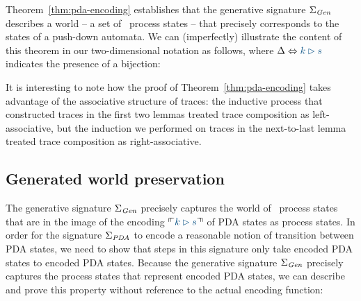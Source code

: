 Theorem~\ref{thm:pda-encoding} establishes that the generative
signature $\Sigma_{\it Gen}$ describes a world -- a set of
\sls~process states -- that precisely corresponds to the states of a
push-down automata.  We can (imperfectly) illustrate the content of
this theorem in our two-dimensional notation as follows, where 
$\Delta \Leftrightarrow \obj{k \rhd s}$ indicates the presence of a
bijection:
\begin{center}
\end{center}

It is interesting to note how the proof of
Theorem~\ref{thm:pda-encoding} takes advantage of the associative
structure of traces: the inductive process that constructed traces in
the first two lemmas treated trace composition as left-associative,
but the induction we performed on traces in the next-to-last lemma
treated trace composition as right-associative.

\subsection{Generated world preservation}
\label{sec:sls-pda-preservation}

The generative signature $\Sigma_{\it Gen}$ precisely captures the
world of \sls~process states that are in the image of the encoding
$\ctxinterp{k \rhd s}$ of PDA states as process states. In order for
the signature $\Sigma_{\it PDA}$ to encode a reasonable notion of
transition between PDA states, we need to show that steps in this
signature only take encoded PDA states to encoded PDA states. Because 
the generative signature $\Sigma_{\it Gen}$ precisely captures the 
process states that represent encoded PDA states, we can describe
and prove this property without reference to the actual encoding function:
 
